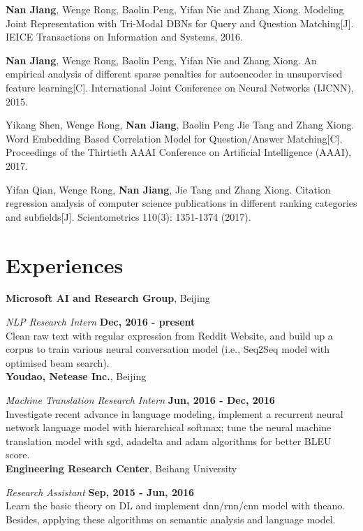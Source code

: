 \documentclass[margin,line]{resume}
\begin{document}
\begin{resume}
\textbf{Nan Jiang}, Wenge Rong, Baolin Peng, Yifan Nie and Zhang Xiong. Modeling Joint Representation with Tri-Modal DBNs for Query and Question Matching[J]. IEICE Transactions on Information and Systems, 2016.

\textbf{Nan Jiang}, Wenge Rong, Baolin Peng, Yifan Nie and Zhang Xiong. An empirical analysis of different sparse penalties for autoencoder in unsupervised feature learning[C]. International Joint Conference on Neural Networks (IJCNN), 2015.

Yikang Shen, Wenge Rong, \textbf{Nan Jiang}, Baolin Peng Jie Tang and Zhang Xiong. Word Embedding Based Correlation Model for Question/Answer Matching[C]. Proceedings of the Thirtieth {AAAI} Conference on Artificial Intelligence (AAAI), 2017.

Yifan Qian, Wenge Rong, \textbf{Nan Jiang}, Jie Tang and Zhang Xiong. Citation regression analysis of computer science publications in different ranking categories and subfields[J]. Scientometrics 110(3): 1351-1374 (2017).



\section{Experiences}
{\bf Microsoft AI and Research Group}, Beijing

{\em NLP Research Intern} \hfill {\bf Dec, 2016 - present}\\
Clean raw text with regular expression from Reddit Website, and build up a corpus to train various neural conversation model (i.e., Seq2Seq model with optimised beam search).\\


{\bf Youdao, Netease Inc.}, Beijing

{\em Machine Translation Research Intern} \hfill {\bf Jun, 2016 - Dec, 2016}\\
Investigate recent advance in language modeling, implement a recurrent neural network language model with hierarchical softmax; tune the neural machine translation model with sgd, adadelta and adam algorithms for better BLEU score.\\


{\bf Engineering Research Center}, Beihang University

{\em Research Assistant} \hfill {\bf Sep, 2015 - Jun, 2016}\\
Learn the basic theory on DL and implement dnn/rnn/cnn model with theano. Besides, applying these algorithms on semantic analysis and language model.




\end{resume}
\end{document}

